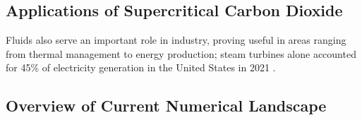 \subsection{Applications of Supercritical Carbon Dioxide}
Fluids also serve an important role in industry, proving useful in areas ranging from thermal management to energy production; steam turbines alone accounted for 45\% of electricity generation in the United States in 2021 \cite{US_elec_gen_stat}.  
\subsection{Overview of Current Numerical Landscape}






